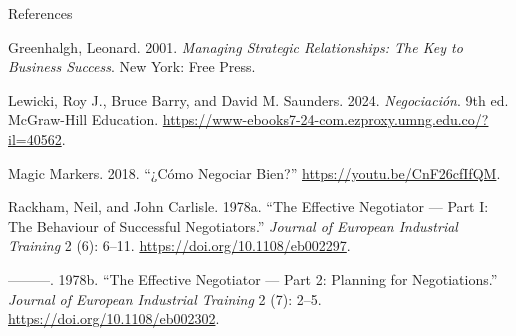 \documentclass[
  ignorenonframetext,
]{beamer}
\newlength{\cslhangindent}
\newenvironment{CSLReferences}[2] %
 {\begin{list}{}{%
  \setlength{\itemindent}{0pt}
  \setlength{\leftmargin}{0pt}
  \setlength{\parsep}{0pt}
  \ifodd #1
   \setlength{\leftmargin}{\cslhangindent}
   \setlength{\itemindent}{-1\cslhangindent}
  \fi
  \setlength{\itemsep}{#2\baselineskip}}}
 {\end{list}}
\begin{document}
\begin{frame}[allowframebreaks]{References}
\label{refs}
\begin{CSLReferences}{1}{0}
Greenhalgh, Leonard. 2001. \emph{Managing Strategic Relationships: The
Key to Business Success}. New York: Free Press.

Lewicki, Roy J., Bruce Barry, and David M. Saunders. 2024.
\emph{Negociación}. 9th ed. McGraw-Hill Education.
\url{https://www-ebooks7-24-com.ezproxy.umng.edu.co/?il=40562}.

Magic Markers. 2018. {``¿{Cómo} Negociar Bien?''}
\url{https://youtu.be/CnF26cfIfQM}.

Rackham, Neil, and John Carlisle. 1978a. {``The {Effective} {Negotiator}
--- {Part} {I}: {The} {Behaviour} of {Successful} {Negotiators}.''}
\emph{Journal of European Industrial Training} 2 (6): 6--11.
\url{https://doi.org/10.1108/eb002297}.

---------. 1978b. {``The {Effective} {Negotiator} --- {Part} 2:
{Planning} for {Negotiations}.''} \emph{Journal of European Industrial
Training} 2 (7): 2--5. \url{https://doi.org/10.1108/eb002302}.

\end{CSLReferences}
\end{frame}
\end{document}
